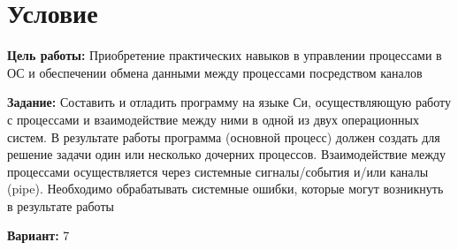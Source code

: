 \section{Условие}
{\bfseries Цель работы:}
Приобретение практических навыков в управлении процессами в ОС и обеспечении обмена данными между процессами посредством каналов

{\bfseries Задание:}
Составить и отладить программу на языке Си, осуществляющую работу с процессами и
взаимодействие между ними в одной из двух операционных систем. В результате работы
программа (основной процесс) должен создать для решение задачи один или несколько
дочерних процессов. Взаимодействие между процессами осуществляется через системные
сигналы/события и/или каналы (pipe).
Необходимо обрабатывать системные ошибки, которые могут возникнуть в результате работы

{\bfseries Вариант:} 7